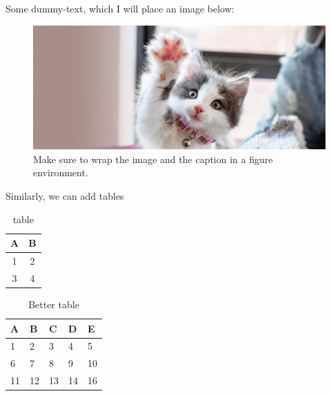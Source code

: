 \documentclass[12pt]{report}
\begin{document}
    Some dummy-text, which I will place an image below:

    \lipsum[1]
    

    \begin{figure}[h!]
        \centering
        \includegraphics[width=\textwidth]{kitten.png}
        \caption{Make sure to wrap the image and the caption in a figure environment.}
        \label{fig:kitten}
    \end{figure}


    Similarly, we can add tables
    \begin{table}[h]
        \centering
        \begin{tabular}{|c|c|}
            \hline
            \textbf{A} & \textbf{B}\\
            \hline
            1 & 2 \\
            \hline
            3 & 4 \\
            \hline
        \end{tabular}
        
        \caption{table}
        \label{tab:my_label}
    \end{table}

    \lipsum[1]
    \begin{table}[h]
        \centering
        
        \begin{tabular}{lllll}
            \toprule
            A  & B  & C  & D  & E  \\
            \midrule
            1  & 2  & 3  & 4  & 5  \\
            6  & 7  & 8  & 9  & 10 \\
            11 & 12 & 13 & 14 & 16 \\
            \bottomrule
        \end{tabular}
        
        \caption{Better table}
        \label{tab:better_table}
        
    \end{table}
\end{document}
